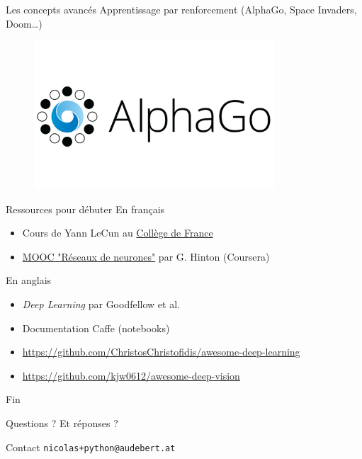 \documentclass{beamer}
\begin{document}
\begin{frame}{Les concepts avancés}
Apprentissage par renforcement (AlphaGo, Space Invaders, Doom\dots)

\begin{figure}
	\includegraphics[width=0.8\textwidth]{alphago}
\end{figure}

\end{frame}

\begin{frame}{Ressources pour débuter}
En français
\begin{itemize}
	\item Cours de Yann LeCun au \href{https://www.college-de-france.fr/site/yann-lecun/course-2015-2016.htm}{Collège de France}
    \item \href{https://fr.coursera.org/learn/neural-networks}{MOOC "Réseaux de neurones"} par G. Hinton (Coursera)
\end{itemize}
En anglais
\begin{itemize}
	\item \textit{Deep Learning} par Goodfellow et al.
    \item Documentation Caffe (notebooks)
    \item \small \url{https://github.com/ChristosChristofidis/awesome-deep-learning}
    \item \small \url{https://github.com/kjw0612/awesome-deep-vision}
\end{itemize}
\end{frame}

\begin{frame}{Fin}
\begin{block}{Questions ?}
Et réponses ?
\end{block}

\begin{exampleblock}{Contact}
\texttt{nicolas+python@audebert.at}
\end{exampleblock}
\end{frame}
\end{document}
